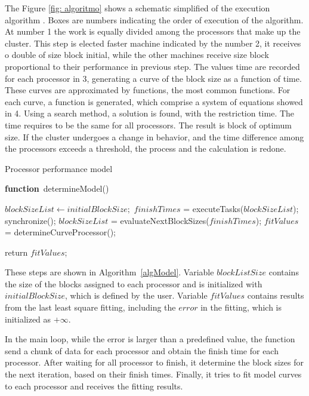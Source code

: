 \documentclass[journal]{IEEEtran}
\begin{document}
The Figure \ref{fig: algoritmo} shows a schematic simplified of the execution algorithm . Boxes are numbers indicating the order of execution of the algorithm. At number 1 the work is equally divided among the processors that make up the cluster. This step is elected faster machine indicated by the number 2, it receives o double of size block initial, while the other machines receive size block proportional to their performance in previous step. The values time ​​are recorded for each processor in 3, generating a curve of the block size as a function of time. These curves are approximated by functions, the most common functions. For each curve, a function is generated, which comprise a system of equations showed in 4. Using a search method, a solution is found, with the restriction time. The time requires to be the same for all processors. The result is block of optimum size. If the cluster undergoes a change in behavior, and the time difference among the processors exceeds a threshold, the process and the calculation is redone.


\begin{algorithm}

\caption{Processor performance model}
\label{algModel}

\begin{algorithmic}		

\STATE \textbf{function}~determineModel()

\STATE $blockSizeList \leftarrow initialBlockSize;$
		\STATE $finishTimes$ = executeTasks($blockSizeList$);
                \STATE synchronize();
	        \STATE $blockSizeList$ = evaluateNextBlockSizes($finishTimes$);
		\STATE $fitValues$ = determineCurveProcessor();
\ENDWHILE

return $fitValues$;

\end{algorithmic}
\end{algorithm}

These steps are shown in Algorithm~\ref{algModel}. Variable $blockListSize$
contains the size of the blocks assigned to each processor and is initialized
with $initialBlockSize$, which is defined by the user. Variable $fitValues$
contains results from the last least square fitting, including the $error$ in
the fitting, which is initialized as $+\infty$.

In the main loop, while the error is larger than a predefined value, the
function send a chunk of data for each processor and obtain the finish time for
each processor. After waiting for all processor to finish, it determine the
block sizes for the next iteration, based on their finish times. Finally, it
tries to fit model curves to each processor and receives the fitting results.
\end{document}
